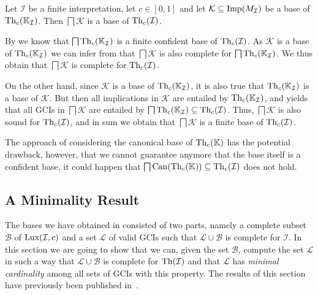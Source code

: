 \begin{Corollary}
  \label{cor:bases-of-implications-to-bases-of-gcis}
  Let $\mathcal{I}$ be a finite interpretation, let $c \in [0,1]$ and let $\mathcal{K}
  \subseteq \operatorname{Imp}(M_{\mathcal{I}})$ be a base of $\operatorname{Th}_c({\mathbb{K}}_{\mathcal{I}})$.  Then
  $\bigsqcap \mathcal{K}$ is a base of $\operatorname{Th}_c(\mathcal{I})$.
\end{Corollary}
\begin{Proof}
  By  we know that
  $\bigsqcap \operatorname{Th}_c({\mathbb{K}}_{\mathcal{I}})$ is a finite confident base of
  $\operatorname{Th}_c(\mathcal{I})$.  As $\mathcal{K}$ is a base of $\operatorname{Th}_c({\mathbb{K}}_{\mathcal{I}})$ we
  can infer from  that
  $\bigsqcap \mathcal{K}$ is also complete for $\bigsqcap \operatorname{Th}_c({\mathbb{K}}_{\mathcal{I}})$.
  We thus obtain that $\bigsqcap \mathcal{K}$ is complete for $\operatorname{Th}_c(\mathcal{I})$.

  On the other hand, since $\mathcal{K}$ is a base of $\operatorname{Th}_c({\mathbb{K}}_{\mathcal{I}})$, it is
  also true that $\operatorname{Th}_c({\mathbb{K}}_{\mathcal{I}})$ is a base of $\mathcal{K}$.  But then all
  implications in $\mathcal{K}$ are entailed by $\operatorname{Th}_c({\mathbb{K}}_{\mathcal{I}})$, and
   yields that all GCIs in
  $\bigsqcap \mathcal{K}$ are entailed by $\bigsqcap \operatorname{Th}_c({\mathbb{K}}_{\mathcal{I}}) \subseteq
  \operatorname{Th}_c(\mathcal{I})$.  Thus, $\bigsqcap \mathcal{K}$ is also sound for
  $\operatorname{Th}_c(\mathcal{I})$, and in sum we obtain that $\bigsqcap \mathcal{K}$ is a finite base
  of $\operatorname{Th}_c(\mathcal{I})$.
\end{Proof}

The approach of considering the canonical base of $\operatorname{Th}_c({\mathbb{K}})$ has the potential
drawback, however, that we cannot guarantee anymore that the base itself is a confident
base, \ie it could happen that $\bigsqcap \operatorname{Can}(\operatorname{Th}_c({\mathbb{K}})) \subseteq
\operatorname{Th}_c(\mathcal{I})$ does not hold.

\subsection{A Minimality Result}
\label{sec:minimality-result}

The bases we have obtained in  consisted of
two parts, namely a complete subset $\mathcal{B}$ of $\operatorname{Lux}(\mathcal{I}, c)$ and a set
$\mathcal{L}$ of valid GCIs such that $\mathcal{L} \cup \mathcal{B}$ is complete for
$\mathcal{I}$.  In this section we are going to show that we can, given the set
$\mathcal{B}$, compute the set $\mathcal{L}$ in such a way that $\mathcal{L} \cup
\mathcal{B}$ is complete for $\operatorname{Th}(\mathcal{I})$ and that $\mathcal{L}$ has \emph{minimal
  cardinality} among all sets of GCIs with this property.  The results of this section
have previously been published in~\cite{Borchmann:confident-GCIs}.

